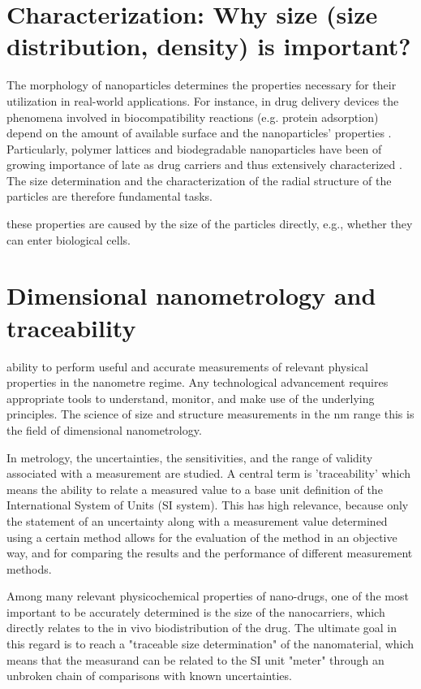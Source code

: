 \section{Characterization: Why size (size distribution, density) is important?}

The morphology of nanoparticles determines the properties necessary for their utilization in real-world applications. For instance, in drug delivery devices the phenomena involved in biocompatibility reactions (e.g. protein adsorption) depend on the amount of available surface and the nanoparticles' properties \citep{vittaz_effect_1996}. Particularly, polymer lattices and biodegradable nanoparticles have been of growing importance of late as drug carriers \citep{kattan_phase_1992} and thus extensively characterized \citep{soppimath_biodegradable_2001}. The size determination and the characterization of the radial structure of the particles are therefore fundamental tasks. 

these properties are caused by the size of the particles directly, e.g., whether they can enter biological cells.

\section{Dimensional nanometrology and traceability}

ability to perform useful and accurate measurements of relevant physical properties in the nanometre regime. Any technological advancement requires appropriate tools to understand, monitor, and make use of the underlying principles. The science of size and structure measurements in the nm range this is the field of dimensional nanometrology.

In metrology, the uncertainties, the sensitivities, and the range of validity associated with a measurement are studied. A central term is 'traceability' which means the ability to relate a measured value to a base unit definition of the International System of Units (SI system). This has high relevance, because only the statement of an uncertainty along with a measurement value determined using a certain method allows for the evaluation of the method in an objective way, and for comparing the results and the performance of different measurement methods.



Among many relevant physicochemical properties of nano-drugs, one of the most important to be accurately determined is the size of the nanocarriers, which directly relates to the in vivo biodistribution of the drug. The ultimate goal in this regard is to reach a "traceable size determination" of the nanomaterial, which means that the measurand can be related to the SI unit "meter" through an unbroken chain of comparisons with known uncertainties. 

